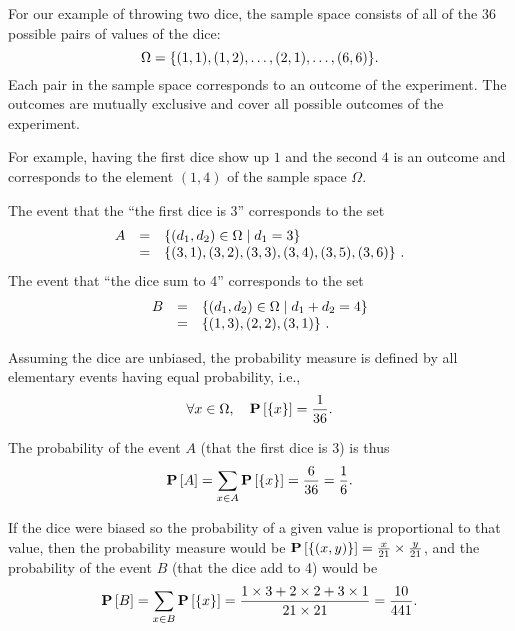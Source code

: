 


\begin{example}
\label{ex:probability::theory::dice}

  For our example of throwing two dice, the sample space
  consists of all of the $36$ possible pairs of values of the dice:
\[
\Omega = \{(1,1),(1,2),\ldots,(2,1),\ldots,(6,6)\}.
\]
%
Each pair in the sample space corresponds to an outcome of the experiment.
%
The outcomes are mutually exclusive and cover all possible outcomes of
the experiment.


For example, having the first dice show up $1$ and the second $4$ is
an outcome and corresponds to  the element $(1,4)$ of the sample space $\Omega$.

The event that the ``the first dice is 3'' corresponds to the
set
\[
\begin{array}{lcl}
  A & = & \left\{ (d_1,d_2) \in \Omega \;|\; d_1 = 3 \right\} \\
  & = &  \{(3,1),(3,2),(3,3),(3,4),(3,5),(3,6)\}~.
\end{array}
\]
The event that ``the dice sum to 4'' corresponds to the set
\[
\begin{array}{lcl}
  B & = & \left\{ (d_1,d_2) \in \Omega \;|\; d_1 + d_2 = 4 \right\}\\
  & = & \{(1,3),(2,2),(3,1)\}~.
\end{array}
\]

Assuming the dice are unbiased, 
the probability measure is defined by all elementary
events having equal probability, i.e.,
\[
\forall x \in \Omega,~~~\mathbf{P}\left[\{x\}\right] = \frac{1}{36}.
\]

The probability of the event $A$ (that the first dice
is 3) is thus 
\[
\mathbf{P}\left[{A}\right] = \sum_{x \in A} \mathbf{P}\left[\{x\}\right] = \frac{6}{36} = \frac{1}{6}. 
\]

If the dice were biased so the probability of a given value is
proportional to that value, then the
probability measure would be
$\mathbf{P}\left[\{(x,y)\}\right] = \frac{x}{21} \times \frac{y}{21}$, and the probability
of the event $B$ (that the dice add to 4) would be
\[
\mathbf{P}\left[{B}\right] = \sum_{x \in B} \mathbf{P}\left[\{x\}\right] = \frac{1 \times 3 + 2 \times 2
  + 3 \times 1}{21 \times 21} = \frac{10}{441}. 
\]


\end{example}



